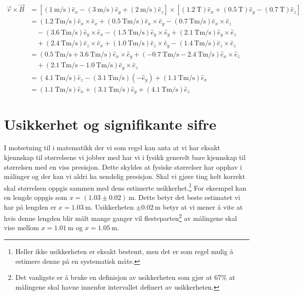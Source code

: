 \documentclass[a4paper,norsk,12pt]{book}
\def\ex{\ensuremath{\hat{e}_x}}
\def\ey{\ensuremath{\hat{e}_y}}
\def\ez{\ensuremath{\hat{e}_z}}
\begin{document}
\begin{displaymath}
\begin{aligned}
	\vec{v}\times\vec{B} &= \left[ (1~\mathrm{m/s})\ex - (3~\mathrm{m/s})\ey + (2~\mathrm{m/s})\ez \right] \times
	\left[(1.2~\mathrm{T})\ex + (0.5~\mathrm{T})\ey - (0.7~\mathrm{T})\ez\right] \\
	&= (1.2~\mathrm{Tm/s})\ex\times\ex + (0.5~\mathrm{Tm/s})\ex\times\ey -  (0.7~\mathrm{Tm/s})\ex\times\ez \\
	&\quad- (3.6~\mathrm{Tm/s})\ey\times\ex- (1.5~\mathrm{Tm/s})\ey\times\ey+ (2.1~\mathrm{Tm/s})\ey\times\ez \\
	&\quad+ (2.4~\mathrm{Tm/s})\ez\times\ex+ (1.0~\mathrm{Tm/s})\ez\times\ey -  (1.4~\mathrm{Tm/s})\ez\times\ez \\
	&=(0.5~\mathrm{Tm/s}+3.6~\mathrm{Tm/s})\ex\times\ey + (-0.7~\mathrm{Tm/s}-2.4~\mathrm{Tm/s})\ex\times\ez \\
	&\quad+(2.1~\mathrm{Tm/s}-1.0~\mathrm{Tm/s})\ey\times\ez \\
	&=(4.1~\mathrm{Tm/s})\ez - (3.1~\mathrm{Tm/s})(-\ey) +(1.1~\mathrm{Tm/s})\ex \\
	&=(1.1~\mathrm{Tm/s})\ex + (3.1~\mathrm{Tm/s})\ey + (4.1~\mathrm{Tm/s})\ez
\end{aligned}
\end{displaymath}

\chapter{Usikkerhet og signifikante sifre}
I motsetning til i matematikk der vi som regel kan anta at vi har eksakt kjennskap til størrelsene vi jobber med har vi i fysikk generelt bare kjennskap til størrelsen med en viss presisjon. Dette skyldes at fysiske størrelser har opphav i målinger og der kan vi aldri ha uendelig presisjon. Skal vi gjøre ting helt korrekt skal størrelsen oppgis sammen med dens estimerte usikkerhet.\footnote{Heller ikke usikkerheten er eksakt bestemt, men det er som regel mulig å estimere denne på en systematisk måte.
} For eksempel kan en lengde oppgis som $x=(1.03\pm0.02)~\mathrm{m}$. Dette betyr det beste estimatet vi har på lengden er $x = 1.03~\mathrm{m}$. Usikkerheten $\pm0.02~\mathrm{m}$ betyr at vi mener å vite at hvis denne lengden blir målt mange ganger vil flesteparten\footnote{Det vanligste er å bruke en definisjon av usikkerheten som gjør at 67\% at målingene skal havne innenfor intervallet definert av usikkerheten.} av målingene skal vise mellom $x=1.01~\mathrm{m}$ og $x=1.05~\mathrm{m}$. 
\end{document}
